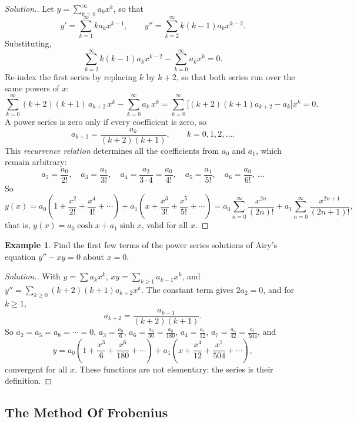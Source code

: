 \documentclass[11pt,a4paper]{article}
\theoremstyle{definition}
\newtheorem{exa}[thm]{Example}
\newenvironment{solution}
  {\renewcommand{\qedsymbol}{}\begin{proof}[\textit{Solution}.]}
  {\end{proof}}
\begin{document}
\begin{solution}
Let $y = \sum^{\infty} _{k = 0} a_k x^k$, so that
\[y' = \sum^{\infty} _{k = 1}k a_k x^{k-1},\qquad y'' = \sum^{\infty} _{k =
2}k(k-1)a_k x^{k-2} .\]
Substituting,
\[\sum^{\infty} _{k = 2}k(k-1)a_k x^{k-2} -\sum^{\infty} _{k = 0} a_k x^k = 0 .\]
Re-index the first series by replacing $k$ by $k + 2$, so that both series run
over the same powers of $x$:
\[\sum^{\infty}_{k = 0} (k+ 2 ) (k + 1) \, a_{k + 2} \, x^k - \sum^{\infty}_{k =
0} a_k\, x^k = \sum^{\infty}_{k=0}\big[(k+2)(k+1)a_{k+2} - a_k\big] x^k = 0 .\]
A power series is zero only if every coefficient is zero, so
\[a_{k+2} = \frac{a_k}{(k+2)(k+1)} ,\qquad k = 0,1,2,\dots .\]
This \emph{recurrence relation} determines all the coefficients from $a_0$ and
$a_1$, which remain arbitrary:
\[a_2 = \frac{a_0}{2!},\quad a_3 = \frac{a_1}{3!},\quad a_4 = \frac{a_2}{3\cdot
4} = \frac{a_0}{4!},\quad a_5 = \frac{a_1}{5!},\quad a_6 = \frac{a_0}{6!},\
\dots\]
So
\[y(x) = a_0\left( 1 + \frac{x^2}{2!}+ \frac{x^4}{4!} +\cdots \right) + a_1
\left(x + \frac{x^3}{3!} + \frac{x^5}{5!}+ \cdots \right) = a_0
\sum^{\infty}_{n = 0} \frac{x^{2n}}{(2n)!} + a_1 \sum^{\infty}_{n=0}
\frac{x^{2n+1}}{(2n+1)!},\]
that is, $y(x) = a_0 \cosh x + a_1 \sinh x$, valid for all $x$.
\end{solution}

\begin{exa}
\label{ex:airy}
Find the first few terms of the power series solutions of Airy's equation
$y'' - xy = 0$ about $x = 0$.
\end{exa}

\begin{solution}
With $y = \sum a_kx^k$, $xy = \sum_{k\geq 1}a_{k-1}x^k$, and $y'' = \sum_{k\geq
0}(k+2)(k+1)a_{k+2}x^k$. The constant term gives $2a_2 = 0$, and for $k\geq 1$,
\[a_{k+2} = \frac{a_{k-1}}{(k+2)(k+1)} .\]
So $a_2 = a_5 = a_8 = \cdots = 0$, $a_3 = \frac{a_0}{6}$, $a_6 =
\frac{a_3}{30} = \frac{a_0}{180}$, $a_4 = \frac{a_1}{12}$, $a_7 = \frac{a_4}{42}
= \frac{a_1}{504}$, and
\[y = a_0\left(1 + \frac{x^3}{6} + \frac{x^6}{180} + \cdots\right) +
a_1\left(x + \frac{x^4}{12} + \frac{x^7}{504} + \cdots\right),\]
convergent for all $x$. These functions are not elementary; the series is their
definition.
\end{solution}

{\color[wave]{485}\subsection{The Method Of Frobenius}}
\end{document}
